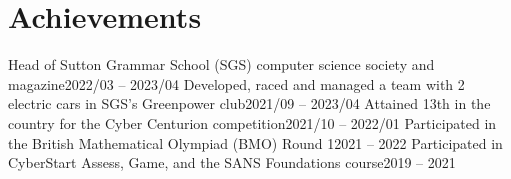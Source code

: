 \documentclass[letterpaper,11pt]{article}
\begin{document}
\section{Achievements}
 \resumeAchievementsListStart
    \resumeAchievements
      {Head of Sutton Grammar School (SGS) computer science society and magazine}{2022/03 -- 2023/04}
    \resumeAchievements
      {Developed, raced and managed a team with 2 electric cars in SGS's Greenpower club}{2021/09 -- 2023/04}
    \resumeAchievements
      {Attained 13th in the country for the Cyber Centurion competition}{2021/10 -- 2022/01}
    \resumeAchievements
      {Participated in the British Mathematical Olympiad (BMO) Round 1}{2021 -- 2022}
    \resumeAchievements
      {Participated in CyberStart Assess, Game, and the SANS Foundations course}{2019 -- 2021}
 \resumeAchievementsListEnd


\end{document}
